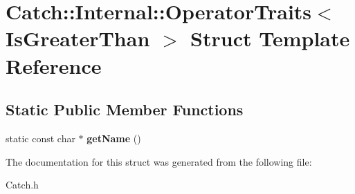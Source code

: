 \hypertarget{struct_catch_1_1_internal_1_1_operator_traits_3_01_is_greater_than_01_4}{\section{Catch\-:\-:Internal\-:\-:Operator\-Traits$<$ Is\-Greater\-Than $>$ Struct Template Reference}
\label{struct_catch_1_1_internal_1_1_operator_traits_3_01_is_greater_than_01_4}
}
\subsection*{Static Public Member Functions}
\begin{DoxyCompactItemize}
\item 
\hypertarget{struct_catch_1_1_internal_1_1_operator_traits_3_01_is_greater_than_01_4_ab917bfb9ccbe461dc684ee5a34d67d27}{static const char $\ast$ {\bfseries get\-Name} ()}\label{struct_catch_1_1_internal_1_1_operator_traits_3_01_is_greater_than_01_4_ab917bfb9ccbe461dc684ee5a34d67d27}

\end{DoxyCompactItemize}


The documentation for this struct was generated from the following file\-:\begin{DoxyCompactItemize}
\item 
Catch.\-h\end{DoxyCompactItemize}
